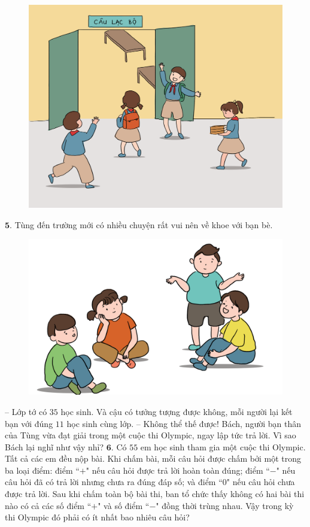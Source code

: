 \begin{multicols}{2}
\begin{figure}[H]
			\includegraphics[width=1\linewidth]{Pi10_ToanBi_Bai4}
			\vspace*{-15pt}
		\end{figure}
	$\pmb{5.}$ Tùng đến trường mới có nhiều chuyện rất vui nên về khoe với bạn bè.
	\begin{figure}[H]
			\centering
			\captionsetup{labelformat= empty, justification=centering}
			\includegraphics[width=1\linewidth]{Pi10_ToanBi_Bai5}
			\vspace*{-15pt}
		\end{figure}
	-- Lớp tớ có $35$ học sinh. Và cậu có tưởng tượng được không, mỗi người lại kết bạn với đúng $11$ học sinh cùng lớp.
	\vskip 0.1cm
	-- Không thể thế được! Bách, người bạn thân của Tùng vừa đạt giải trong một cuộc thi Olympic, ngay lập tức trả lời.
	\vskip 0.1cm
	Vì sao Bách lại nghĩ như vậy nhỉ?
	\vskip 0.1cm
	$\pmb{6.}$ Có $55$ em học sinh tham gia một cuộc thi Olympic. Tất cả các em đều nộp bài. Khi chấm bài, mỗi câu hỏi được chấm bởi một trong ba loại điểm: điểm ``$+$" nếu câu hỏi được trả lời hoàn toàn đúng; điểm ``$-$" nếu câu hỏi đã có trả lời nhưng chưa ra đúng đáp số; và điểm ``$0$" nếu câu hỏi chưa được trả lời. Sau khi chấm toàn bộ bài thi, ban tổ chức thấy không có hai bài thi nào có cả các số điểm ``$+$" và số điểm ``$-$" đồng thời trùng nhau. Vậy trong kỳ thi Olympic đó phải có ít nhất bao nhiêu câu hỏi?
\end{multicols}

